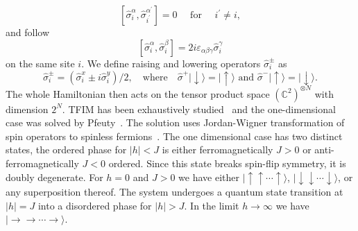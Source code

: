 \begin{equation}
	\left[\hat{\sigma}_{i}^{\alpha}, \hat{\sigma}_{i^{\prime}}^{\alpha^{\prime}}\right]=0 \quad \text { for } \quad i^{\prime} \neq i, 
\end{equation}
and follow 
\begin{equation}
	\left[\hat \sigma^\alpha_{i}, \hat \sigma^\beta_{i}\right]=2 i \varepsilon_{\alpha \beta \gamma} \hat \sigma^\gamma_{i}
\end{equation}
on the same site $i$. We define raising and lowering operators $\hat{\sigma}_{i}^{\pm}$ as
\begin{equation}
\hat{\sigma}_{i}^{\pm} = \left(\hat{\sigma}_{i}^{x} \pm i \hat{\sigma}_{i}^{y}\right) / 2, \quad \text{where} \quad \hat{\sigma}^{+}|\downarrow\rangle=|\uparrow\rangle \text { and } \hat{\sigma}^{-}|\uparrow\rangle=|\downarrow\rangle.
\end{equation}
The whole Hamiltonian then acts on the tensor product space $\left(\mathbb{C}^{2}\right)^{\otimes N}$ with dimension $2^N$. TFIM has been exhaustively studied~\cite{stinchcombe1973isingI, stinchcombe1973isingII} and the one-dimensional case was solved by Pfeuty~\cite{pfeuty1970one}. The solution uses Jordan-Wigner transformation of spin operators to spinless fermions~\cite{lieb1961two, niemeijer1967some}. The one dimensional case has two distinct states, the ordered phase for $|h| < J$ is either ferromagnetically $J > 0$ or anti-ferromagnetically $J < 0$ ordered. Since this state breaks spin-flip symmetry, it is doubly degenerate. For $h=0$ and $J>0$ we have either $|\uparrow \uparrow \cdots \uparrow \rangle$, $|\downarrow \downarrow \cdots \downarrow \rangle$, or any superposition thereof. The system undergoes a quantum state transition at $|h| = J$ into a disordered phase for $|h| > J$. In the limit $h \rightarrow \infty$ we have $|\rightarrow \rightarrow \cdots \rightarrow \rangle$. 


